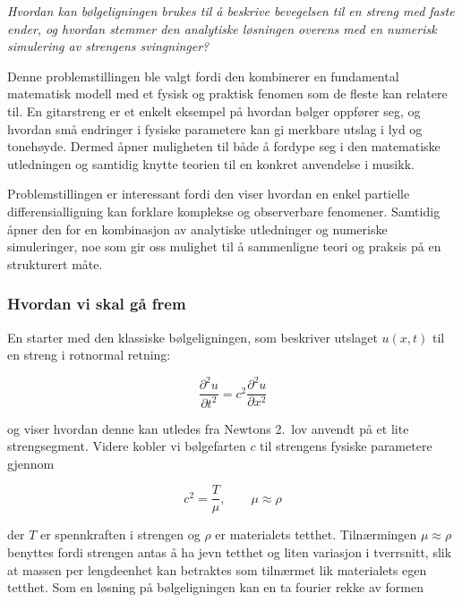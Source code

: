 \begin{center}
    \textit{Hvordan kan bølgeligningen brukes til å beskrive bevegelsen til en streng med faste ender, 
    og hvordan stemmer den analytiske løsningen overens med en numerisk simulering av strengens 
    svingninger?}
\end{center}

Denne problemstillingen ble valgt fordi den kombinerer en fundamental matematisk modell 
med et fysisk og praktisk fenomen som de fleste kan relatere til. En gitarstreng er et enkelt
eksempel på hvordan bølger oppfører seg, og hvordan små endringer i fysiske parametere kan gi 
merkbare utslag i lyd og tonehøyde. Dermed åpner muligheten til både å fordype seg i 
den matematiske utledningen og samtidig knytte teorien til en konkret anvendelse i musikk.

Problemstillingen er interessant fordi den viser hvordan en enkel partielle differensialligning 
kan forklare komplekse og observerbare fenomener. Samtidig åpner den for en kombinasjon 
av analytiske utledninger og numeriske simuleringer, noe som gir oss mulighet til å sammenligne 
teori og praksis på en strukturert måte.

\subsubsection*{Hvordan vi skal gå frem}

En starter med den klassiske bølgeligningen, som beskriver utslaget $u(x,t)$ til en streng i rotnormal retning:

\begin{equation*}
  \frac{\partial^2 u}{\partial t^2} = c^2 \frac{\partial^2 u}{\partial x^2}
  \label{eq:bolgeligningen}
\end{equation*}

og viser hvordan denne kan utledes fra Newtons 2.~lov anvendt på et lite strengsegment.
Videre kobler vi bølgefarten $c$ til strengens fysiske parametere gjennom

\begin{equation}
  c^2 = \frac{T}{\mu}, \qquad \mu \approx \rho \label{eq:bølgefart}
\end{equation}

der $T$ er spennkraften i strengen og $\rho$ er materialets tetthet. 
Tilnærmingen $\mu \approx \rho$ benyttes fordi strengen antas å ha 
jevn tetthet og liten variasjon i tverrsnitt, slik at massen per lengdeenhet kan betraktes som tilnærmet lik materialets egen tetthet.
Som en løsning på bølgeligningen kan en ta fourier rekke av formen

